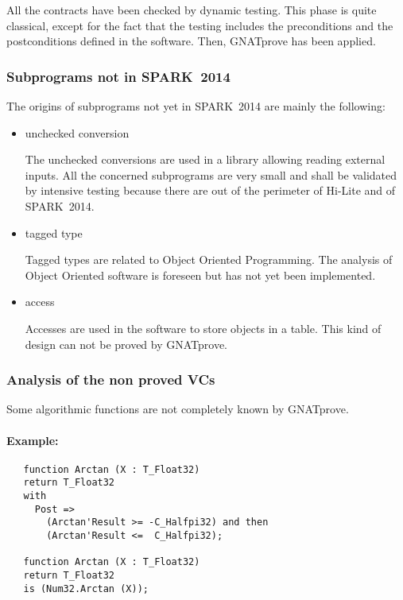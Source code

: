 \documentclass[10pt,a4paper,twocolumn]{article}
\newcommand{\hilite}{Hi-Lite\xspace}
\newcommand{\gnatprove}{GNATprove\xspace}
\newcommand{\newspark}{SPARK~2014\xspace}
\begin{document}
All the contracts have been checked by dynamic testing. This phase is quite classical, except for the fact that the testing includes the preconditions and the postconditions defined in the software. Then, \gnatprove has been applied.

\subsubsection{Subprograms not in \newspark}

The origins of subprograms not yet in \newspark are mainly the following:

\begin{itemize}
\item unchecked conversion

The unchecked conversions are used in a library allowing reading external inputs.
All the concerned subprograms are very small and shall be validated by intensive testing because there are out of the perimeter of \hilite and of \newspark.
\item tagged type

Tagged types are related to Object Oriented Programming. The analysis of Object Oriented software is foreseen but has not yet been implemented.
\item access

Accesses are used in the software to store objects in a table.
This kind of design can not be proved by \gnatprove.
\end{itemize}

\subsubsection{Analysis of the non proved VCs}

Some algorithmic functions are not completely known by \gnatprove.

\paragraph{Example:}

\begin{lstlisting}
   function Arctan (X : T_Float32)
   return T_Float32
   with
     Post =>
       (Arctan'Result >= -C_Halfpi32) and then
       (Arctan'Result <=  C_Halfpi32);

   function Arctan (X : T_Float32)
   return T_Float32
   is (Num32.Arctan (X));
\end{lstlisting}
\end{document}
